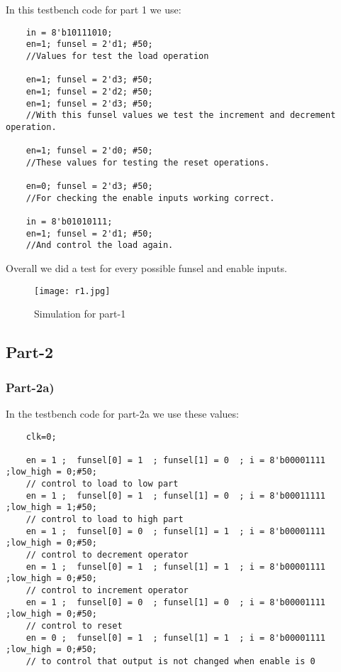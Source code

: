 \documentclass[12pt]{article}
\begin{document}
In this testbench code for part 1 we use:

\begin{lstlisting}
    in = 8'b10111010;
    en=1; funsel = 2'd1; #50;
    //Values for test the load operation
    
    en=1; funsel = 2'd3; #50;
    en=1; funsel = 2'd2; #50;
    en=1; funsel = 2'd3; #50;
    //With this funsel values we test the increment and decrement operation.

    en=1; funsel = 2'd0; #50;
    //These values for testing the reset operations.

    en=0; funsel = 2'd3; #50;
    //For checking the enable inputs working correct.
    
    in = 8'b01010111;
    en=1; funsel = 2'd1; #50;
    //And control the load again.
\end{lstlisting}

Overall we did a test for every possible funsel and enable inputs.

\vspace{1cm}
\begin{figure}[H]
    \centering
    \texttt{[image: r1.jpg]}
    \caption{Simulation for part-1 }
    \label{fig:result1}
\end{figure}


\clearpage

 \subsection{Part-2}

\subsubsection{Part-2a)}

In the testbench code for part-2a we use these values:

\begin{lstlisting}
    clk=0;
    
    en = 1 ;  funsel[0] = 1  ; funsel[1] = 0  ; i = 8'b00001111 ;low_high = 0;#50;    
    // control to load to low part
    en = 1 ;  funsel[0] = 1  ; funsel[1] = 0  ; i = 8'b00011111 ;low_high = 1;#50;    
    // control to load to high part
    en = 1 ;  funsel[0] = 0  ; funsel[1] = 1  ; i = 8'b00001111 ;low_high = 0;#50;  
    // control to decrement operator
    en = 1 ;  funsel[0] = 1  ; funsel[1] = 1  ; i = 8'b00001111 ;low_high = 0;#50;    
    // control to increment operator
    en = 1 ;  funsel[0] = 0  ; funsel[1] = 0  ; i = 8'b00001111 ;low_high = 0;#50;    
    // control to reset
    en = 0 ;  funsel[0] = 1  ; funsel[1] = 1  ; i = 8'b00001111 ;low_high = 0;#50;    
    // to control that output is not changed when enable is 0
\end{lstlisting}
\end{document}
